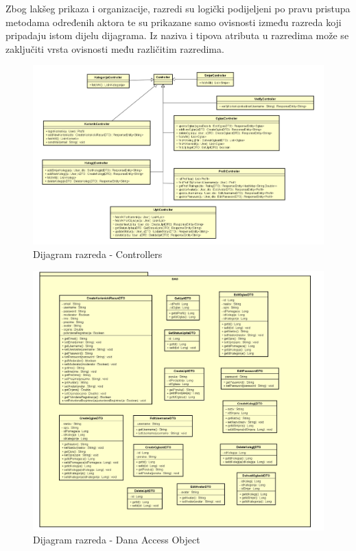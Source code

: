 			Zbog lakšeg prikaza i organizacije, razredi su logički podijeljeni po pravu pristupa metodama određenih aktora te su prikazane samo ovisnosti između razreda koji pripadaju istom dijelu dijagrama. Iz naziva i tipova atributa u razredima može se zaključiti vrsta ovisnosti među različitim razredima.
			
			\begin{figure}[H]
				\includegraphics[scale=0.35]{dijagrami/dijagram_razreda_controllers.png}
				\centering
				\caption{Dijagram razreda - Controllers}
				\label{fig:cont}
			\end{figure}
		
			\begin{figure}[H]
				\includegraphics[scale=0.37]{dijagrami/dijagram_razreda_DAO.png}
				\centering
				\caption{Dijagram razreda - Dana Access Object}
				\label{fig:DAO}
			\end{figure}
			
